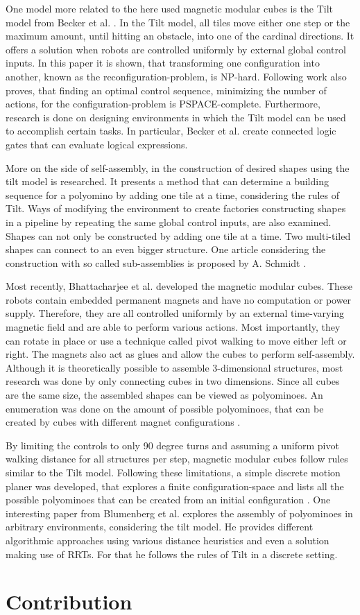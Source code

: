 One model more related to the here used magnetic modular cubes is the Tilt model from Becker et al. \cite{Becker2014_SP}.
In the Tilt model, all tiles move either one step or the maximum amount, until hitting an obstacle, into one of the cardinal directions.
It offers a solution when robots are controlled uniformly by external global control inputs.
In this paper it is shown, that transforming one configuration into another, known as the reconfiguration-problem, is NP-hard.
Following work \cite{Becker2014} also proves, that finding an optimal control sequence, minimizing the number of actions, for the configuration-problem is PSPACE-complete.
Furthermore, research is done on designing environments in which the Tilt model can be used to accomplish certain tasks.
In particular, Becker et al. \cite{Becker2014} create connected logic gates that can evaluate logical expressions.

More on the side of self-assembly, in \cite{Becker2020} the construction of desired shapes using the tilt model is researched.
It presents a method that can determine a building sequence for a polyomino by adding one tile at a time, considering the rules of Tilt.
Ways of modifying the environment to create factories constructing shapes in a pipeline by repeating the same global control inputs, are also examined.
Shapes can not only be constructed by adding one tile at a time.
Two multi-tiled shapes can connect to an even bigger structure.
One article considering the construction with so called sub-assemblies is proposed by A. Schmidt \cite{Schmidt2018}.

Most recently, Bhattacharjee et al. \cite{Bhattacharjee2022} developed the magnetic modular cubes.
These robots contain embedded permanent magnets and have no computation or power supply.
Therefore, they are all controlled uniformly by an external time-varying magnetic field and are able to perform various actions.
Most importantly, they can rotate in place or use a technique called pivot walking to move either left or right.
The magnets also act as glues and allow the cubes to perform self-assembly.
Although it is theoretically possible to assemble 3-dimensional structures, most research was done by only connecting cubes in two dimensions.
Since all cubes are the same size, the assembled shapes can be viewed as polyominoes.
An enumeration was done on the amount of possible polyominoes, that can be created by cubes with different magnet configurations \cite{Lu2021}.

By limiting the controls to only 90 degree turns and assuming a uniform pivot walking distance for all structures per step, magnetic modular cubes follow rules similar to the Tilt model.
Following these limitations, a simple discrete motion planer was developed, that explores a finite configuration-space and lists all the possible polyominoes that can be created from an initial configuration \cite{Bhattacharjee2022}.
One interesting paper from Blumenberg et al. \cite{blumenberg2023} explores the assembly of polyominoes in arbitrary environments, considering the tilt model.
He provides different algorithmic approaches using various distance heuristics and even a solution making use of RRTs.
For that he follows the rules of Tilt in a discrete setting.


\section{Contribution}

